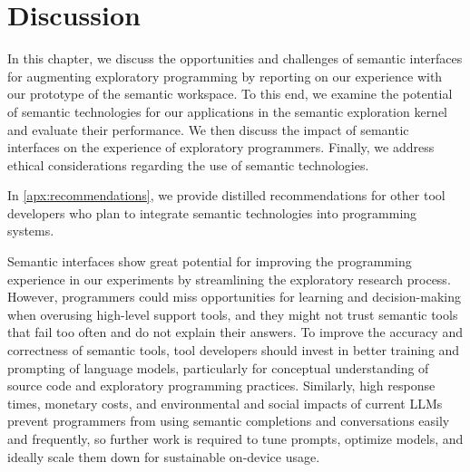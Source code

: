 
\chapter{Discussion}
\label{cha:discussion}

In this chapter, we discuss the opportunities and challenges of semantic interfaces for augmenting exploratory programming by reporting on our experience with our prototype of the semantic workspace.
To this end, we examine the potential of semantic technologies for our applications in the semantic exploration kernel and evaluate their performance.
We then discuss the impact of semantic interfaces on the experience of exploratory programmers.
Finally, we address ethical considerations regarding the use of semantic technologies.

In \cref{apx:recommendations}, we provide distilled recommendations for other tool developers who plan to integrate semantic technologies into programming systems.


\begin{summary}
	Semantic interfaces show great potential for improving the programming experience in our experiments by streamlining the exploratory research process.
	However, programmers could miss opportunities for learning and decision-making when overusing high-level support tools, and they might not trust semantic tools that fail too often and do not explain their answers.
	To improve the accuracy and correctness of semantic tools, tool developers should invest in better training and prompting of language models, particularly for conceptual understanding of source code and exploratory programming practices.
	Similarly, high response times, monetary costs, and environmental and social impacts of current LLMs prevent programmers from using semantic completions and conversations easily and frequently, so further work is required to tune prompts, optimize models, and ideally scale them down for sustainable on-device usage.
\end{summary}
